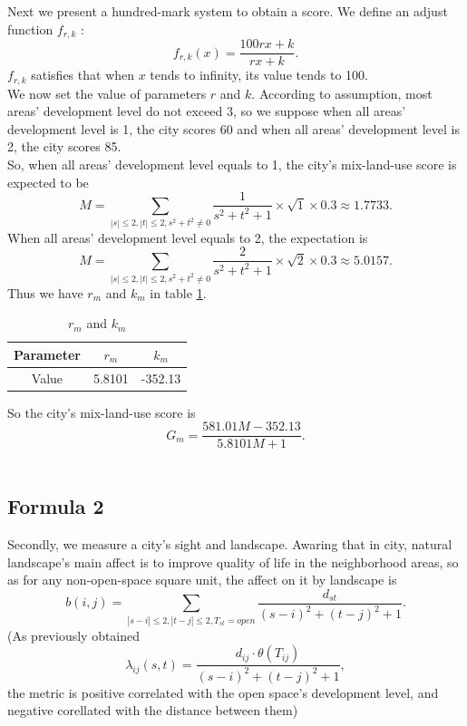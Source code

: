 Next we present a hundred-mark system to obtain a score.
We define an adjust function $ f_{r,k} $ : $$ f_{r,k}(x) = \frac{100rx+k}{rx+k}. $$ $ f_{r,k} $ satisfies that when $x$ tends to infinity, its value tends to 100.\\

We now set the value of parameters $r$ and $k$.
According to assumption, most areas' development level do not exceed 3, so we suppose when all areas' development level is 1, the city scores 60 and when all areas' development level is 2, the city scores 85.\\

So, when all areas' development level equals to 1, the city's mix-land-use score is expected to be $$ M=\sum_{|s|\leq 2, |t|\leq 2, s^2+t^2 \neq 0} \frac{1}{s^2+t^2+1} \times \sqrt{1} \times 0.3 \approx 1.7733. $$
When all areas' development level equals to 2, the expectation is $$ M=\sum_{|s|\leq 2, |t|\leq 2, s^2+t^2 \neq 0} \frac{2}{s^2+t^2+1} \times \sqrt{2} \times 0.3 \approx 5.0157. $$
Thus we have $ r_m $ and $ k_m $ in table \ref{tab:f1-data}.\\
\begin{table}[t]
\centering
  \begin{tabular}{c|cc}
    \hline
    Parameter & $r_m$ & $k_m$ \\
    \hline
    Value & 5.8101 & -352.13 \\
    \hline
  \end{tabular}
  \caption{$r_m$ and $k_m$}
  \label{tab:f1-data}
\end{table}

So the city's mix-land-use score is $$ G_m=\frac{581.01M-352.13}{5.8101M+1}. $$\\

\subsection{Formula 2}
Secondly, we measure a city's sight and landscape.
Awaring that in city, natural landscape's main affect is to improve quality of life in the neighborhood areas, so as for any non-open-space square unit, the affect on it by landscape is $$ b(i,j) = \sum_{|s-i|\leq 2, |t-j|\leq 2, T_{st}=open} \frac{d_{st}}{(s-i)^2+(t-j)^2+1}. $$
(As previously obtained $$ \lambda_{ij}(s,t) = \frac{d_{ij} \cdot \theta (T_{ij})}{(s-i)^2 + (t-j)^2 + 1}, $$ the metric is positive correlated with the open space's development level, and negative corellated with the distance between them)\\

